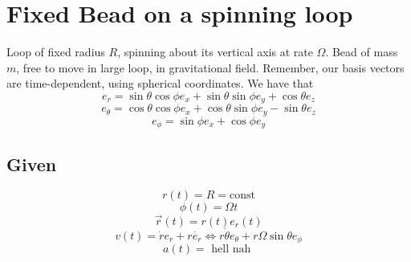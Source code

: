 \documentclass{article}
\newtheorem{one minute paper}[theorem]{One Minute Paper}
\begin{document}
\begin{center}
\end{center}

\section*{Fixed Bead on a spinning loop}

Loop of fixed radius $R$, spinning about its vertical axis at rate $\Omega$. Bead of mass $m$, free to move in large loop, in gravitational field.
Remember, our basis vectors are time-dependent, using spherical coordinates. We have that 
\begin{equation}
    e_r = \sin\theta\cos\phi e_x + \sin\theta\sin\phi e_y + \cos\theta e_z
\end{equation}
\begin{equation}
    e_\theta = \cos\theta\cos\phi e_x + \cos\theta\sin\phi e_y - \sin\theta e_z
\end{equation}
\begin{equation}
    e_\phi = \sin\phi e_x + \cos\phi e_y
\end{equation}

\subsection*{Given}
\begin{equation}
    r(t) = R = \text{const}
\end{equation}
\begin{equation}
    \phi(t) = \Omega t
\end{equation}
\begin{equation}
    \vec{r}(t) = r(t)e_r(t)
\end{equation}
\begin{equation}
    v(t) = \dot{r}e_r + r\dot{e_r} \iff r\dot{\theta}e_\theta + r\Omega\sin\theta e_\phi
\end{equation}
\begin{equation}
    a(t) = \text{ hell nah }
\end{equation}
\end{document}
